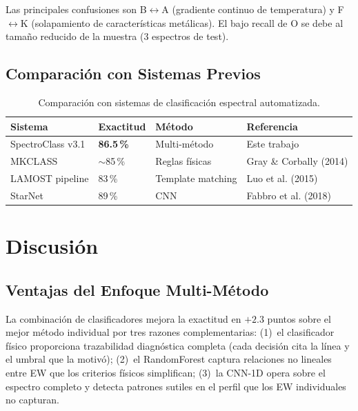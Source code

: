\documentclass[12pt,a4paper]{article}
\begin{document}
Las principales confusiones son B$\leftrightarrow$A (gradiente continuo de temperatura)
y F$\leftrightarrow$K (solapamiento de características metálicas).
El bajo recall de O se debe al tamaño reducido de la muestra (3 espectros de test).

\subsection{Comparación con Sistemas Previos}

\begin{table}[H]
  \centering
  \caption{Comparación con sistemas de clasificación espectral automatizada.}
  \label{tab:comparacion}
  \renewcommand{\arraystretch}{1.2}
  \begin{tabular}{llll}
    \toprule
    \textbf{Sistema} & \textbf{Exactitud} & \textbf{Método} & \textbf{Referencia} \\
    \midrule
    SpectroClass v3.1 & \textbf{86.5\,\%} & Multi-método & Este trabajo \\
    MKCLASS & $\sim$85\,\% & Reglas físicas & Gray \& Corbally (2014) \\
    LAMOST pipeline & 83\,\% & Template matching & Luo et al. (2015) \\
    StarNet & 89\,\% & CNN & Fabbro et al. (2018) \\
    \bottomrule
  \end{tabular}
\end{table}

\section{Discusión}

\subsection{Ventajas del Enfoque Multi-Método}

La combinación de clasificadores mejora la exactitud en $+2.3$ puntos sobre el mejor
método individual por tres razones complementarias: (1)~el clasificador físico
proporciona trazabilidad diagnóstica completa (cada decisión cita la línea y el umbral
que la motivó); (2)~el RandomForest captura relaciones no lineales entre EW que los
criterios físicos simplifican; (3)~la CNN-1D opera sobre el espectro completo y
detecta patrones sutiles en el perfil que los EW individuales no capturan.
\end{document}
